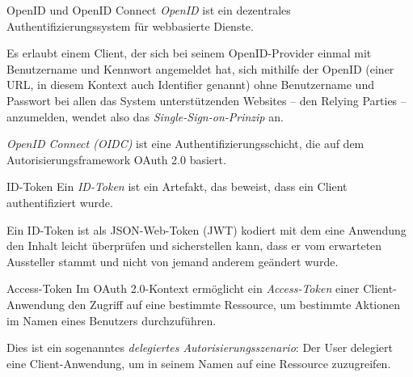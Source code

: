 \begin{bonus}{OpenID und OpenID Connect}
    \emph{OpenID} ist ein dezentrales Authentifizierungssystem für webbasierte Dienste.

    Es erlaubt einem Client, der sich bei seinem OpenID-Provider einmal mit Benutzername und Kennwort angemeldet hat, sich mithilfe der OpenID (einer URL, in diesem Kontext auch Identifier genannt) ohne Benutzername und Passwort bei allen das System unterstützenden Websites – den Relying Parties – anzumelden, wendet also das \emph{Single-Sign-on-Prinzip} an.

    \emph{OpenID Connect (OIDC)} ist eine Authentifizierungsschicht, die auf dem Autorisierungsframework OAuth 2.0 basiert.
\end{bonus}

\begin{bonus}{ID-Token}
    Ein \emph{ID-Token} ist ein Artefakt, das beweist, dass ein Client authentifiziert wurde.

    Ein ID-Token ist als JSON-Web-Token (JWT) kodiert mit dem eine Anwendung den Inhalt leicht überprüfen und sicherstellen kann, dass er vom erwarteten Aussteller stammt und nicht von jemand anderem geändert wurde.
\end{bonus}

\begin{bonus}{Access-Token}
    Im OAuth 2.0-Kontext ermöglicht ein \emph{Access-Token} einer Client-Anwendung den Zugriff auf eine bestimmte Ressource, um bestimmte Aktionen im Namen eines Benutzers durchzuführen.

    Dies ist ein sogenanntes \emph{delegiertes Autorisierungsszenario}:
    Der User delegiert eine Client-Anwendung, um in seinem Namen auf eine Ressource zuzugreifen.
\end{bonus}